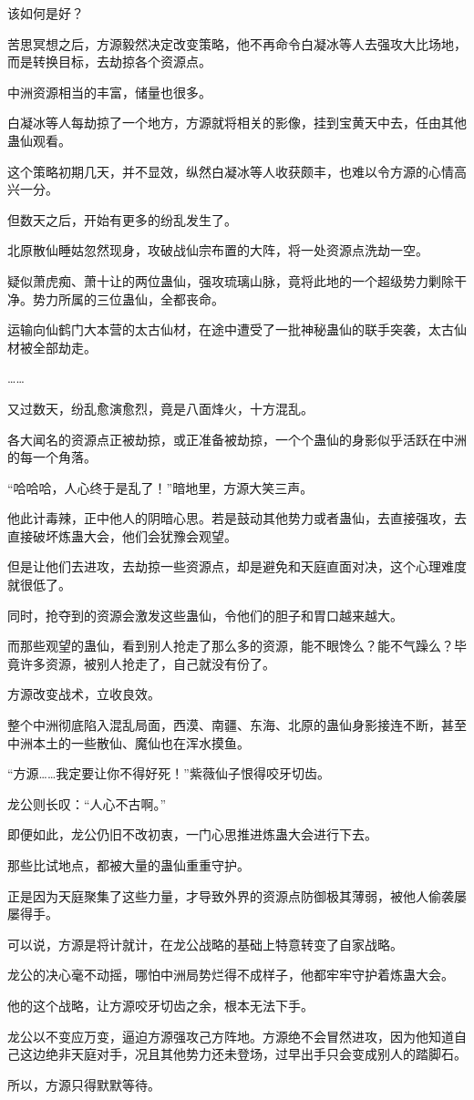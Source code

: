 \begin{this_body}
该如何是好？

苦思冥想之后，方源毅然决定改变策略，他不再命令白凝冰等人去强攻大比场地，而是转换目标，去劫掠各个资源点。

中洲资源相当的丰富，储量也很多。

白凝冰等人每劫掠了一个地方，方源就将相关的影像，挂到宝黄天中去，任由其他蛊仙观看。

这个策略初期几天，并不显效，纵然白凝冰等人收获颇丰，也难以令方源的心情高兴一分。

但数天之后，开始有更多的纷乱发生了。

北原散仙睡姑忽然现身，攻破战仙宗布置的大阵，将一处资源点洗劫一空。

疑似萧虎痴、萧十让的两位蛊仙，强攻琉璃山脉，竟将此地的一个超级势力剿除干净。势力所属的三位蛊仙，全都丧命。

运输向仙鹤门大本营的太古仙材，在途中遭受了一批神秘蛊仙的联手突袭，太古仙材被全部劫走。

……

又过数天，纷乱愈演愈烈，竟是八面烽火，十方混乱。

各大闻名的资源点正被劫掠，或正准备被劫掠，一个个蛊仙的身影似乎活跃在中洲的每一个角落。

“哈哈哈，人心终于是乱了！”暗地里，方源大笑三声。

他此计毒辣，正中他人的阴暗心思。若是鼓动其他势力或者蛊仙，去直接强攻，去直接破坏炼蛊大会，他们会犹豫会观望。

但是让他们去进攻，去劫掠一些资源点，却是避免和天庭直面对决，这个心理难度就很低了。

同时，抢夺到的资源会激发这些蛊仙，令他们的胆子和胃口越来越大。

而那些观望的蛊仙，看到别人抢走了那么多的资源，能不眼馋么？能不气躁么？毕竟许多资源，被别人抢走了，自己就没有份了。

方源改变战术，立收良效。

整个中洲彻底陷入混乱局面，西漠、南疆、东海、北原的蛊仙身影接连不断，甚至中洲本土的一些散仙、魔仙也在浑水摸鱼。

“方源……我定要让你不得好死！”紫薇仙子恨得咬牙切齿。

龙公则长叹：“人心不古啊。”

即便如此，龙公仍旧不改初衷，一门心思推进炼蛊大会进行下去。

那些比试地点，都被大量的蛊仙重重守护。

正是因为天庭聚集了这些力量，才导致外界的资源点防御极其薄弱，被他人偷袭屡屡得手。

可以说，方源是将计就计，在龙公战略的基础上特意转变了自家战略。

龙公的决心毫不动摇，哪怕中洲局势烂得不成样子，他都牢牢守护着炼蛊大会。

他的这个战略，让方源咬牙切齿之余，根本无法下手。

龙公以不变应万变，逼迫方源强攻己方阵地。方源绝不会冒然进攻，因为他知道自己这边绝非天庭对手，况且其他势力还未登场，过早出手只会变成别人的踏脚石。

所以，方源只得默默等待。

\end{this_body}


